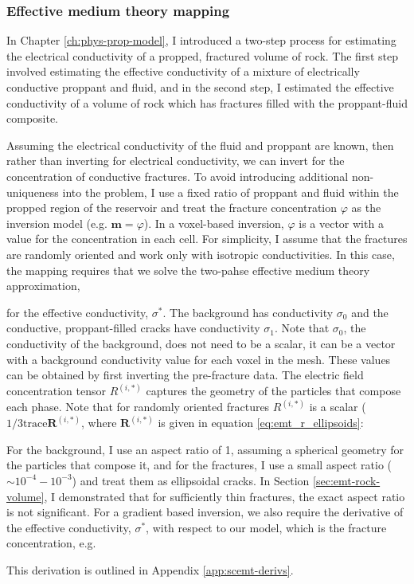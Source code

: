 \subsubsection{Effective medium theory mapping}
\label{sec:emt_mapping}

In Chapter \ref{ch:phys-prop-model}, I introduced a two-step process for estimating the electrical conductivity of a propped, fractured volume of rock. The first step involved estimating the effective conductivity of a mixture of electrically conductive proppant and fluid, and in the second step, I estimated the effective conductivity of a volume of rock which has fractures filled with the proppant-fluid composite.

Assuming the electrical conductivity of the fluid and proppant are known, then rather than inverting for electrical conductivity, we can invert for the concentration of conductive fractures. To avoid introducing additional non-uniqueness into the problem, I use a fixed ratio of proppant and fluid within the propped region of the reservoir and treat the fracture concentration $\varphi$ as the inversion model (e.g. $\mathbf{m} = \varphi$). In a voxel-based inversion, $\varphi$ is a vector with a value for the concentration in each cell. For simplicity, I assume that the fractures are randomly oriented and work only with isotropic conductivities. In this case, the mapping requires that we solve the two-pahse effective medium theory approximation,

for the effective conductivity, $\sigma^*$. The background has conductivity $\sigma_0$ and the conductive, proppant-filled cracks have conductivity $\sigma_1$. Note that $\sigma_0$, the conductivity of the background, does not need to be a scalar, it can be a vector with a background conductivity value for each voxel in the mesh. These values can be obtained by first inverting the pre-fracture data. The electric field concentration tensor $R^{(i,*)}$ captures the geometry of the particles that compose each phase. Note that for randomly oriented fractures $R^{(i,*)}$ is a scalar ($1/3 \text{trace}{\mathbf{R}^{(i,*)}}$, where $\mathbf{R}^{(i,*)}$ is given in equation \ref{eq:emt_r_ellipsoids}:

For the background, I use an aspect ratio of 1, assuming a spherical geometry for the particles that compose it, and for the fractures, I use a small aspect ratio ($\sim 10^{-4} - 10^{-3}$) and treat them as ellipsoidal cracks. In Section \ref{sec:emt-rock-volume}, I demonstrated that for sufficiently thin fractures, the exact aspect ratio is not significant. For a gradient based inversion, we also require the derivative of the effective conductivity, $\sigma^*$, with respect to our model, which is the fracture concentration, e.g.

 This derivation is outlined in Appendix \ref{app:scemt-derivs}.

